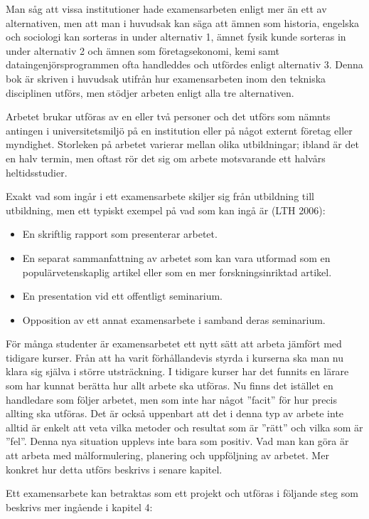 Man såg att vissa institutioner hade examensarbeten enligt mer än ett av
alternativen, men att man i huvudsak kan säga att ämnen som historia,
engelska och sociologi kan sorteras in under alternativ 1, ämnet fysik
kunde sorteras in under alternativ 2 och ämnen som företagsekonomi, kemi
samt dataingenjörsprogrammen ofta handleddes och utfördes enligt
alternativ 3. Denna bok är skriven i huvudsak utifrån hur examensarbeten
inom den tekniska disciplinen utförs, men stödjer arbeten enligt alla
tre alternativen.

Arbetet brukar utföras av en eller två personer och det utförs som
nämnts antingen i universitetsmiljö på en institution eller på något
externt företag eller myndighet. Storleken på arbetet varierar mellan
olika utbildningar; ibland är det en halv termin, men oftast rör det sig
om arbete motsvarande ett halvårs heltidsstudier.

Exakt vad som ingår i ett examensarbete skiljer sig från utbildning till
utbildning, men ett typiskt exempel på vad som kan ingå är (LTH 2006):

\begin{itemize}
\item
  En skriftlig rapport som presenterar arbetet.
\item
  En separat sammanfattning av arbetet som kan vara utformad som en
  populärvetenskaplig artikel eller som en mer forskningsinriktad
  artikel.
\item
  En presentation vid ett offentligt seminarium.
\item
  Opposition av ett annat examensarbete i samband deras seminarium.
\end{itemize}

För många studenter är examensarbetet ett nytt sätt att arbeta jämfört
med tidigare kurser. Från att ha varit förhållandevis styrda i kurserna
ska man nu klara sig själva i större utsträckning. I tidigare kurser har
det funnits en lärare som har kunnat berätta hur allt arbete ska
utföras. Nu finns det istället en handledare som följer arbetet, men som
inte har något ''facit'' för hur precis allting ska utföras. Det är
också uppenbart att det i denna typ av arbete inte alltid är enkelt att
veta vilka metoder och resultat som är ''rätt'' och vilka som är
''fel''. Denna nya situation upplevs inte bara som positiv. Vad man kan
göra är att arbeta med målformulering, planering och uppföljning av
arbetet. Mer konkret hur detta utförs beskrivs i senare kapitel.

Ett examensarbete kan betraktas som ett projekt och utföras i följande
steg som beskrivs mer ingående i kapitel 4:

